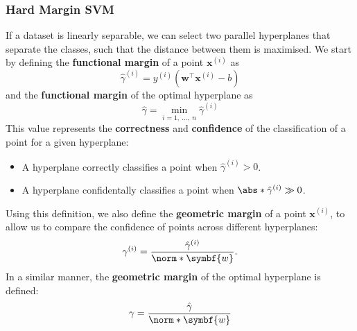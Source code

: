 \documentclass{article}
\begin{document}
\subsubsection{Hard Margin SVM}
If a dataset is linearly separable, we can select two parallel
hyperplanes that separate the classes, such that the distance between
them is maximised.
We start by defining the \textbf{functional margin} of a point
\(\symbf{x}^{\left( i \right)}\) as
\begin{equation*}
    \hat{\gamma}^{\left( i \right)} = y^{\left( i \right)} \left( \symbf{w}^\top \symbf{x}^{\left( i \right)} - b \right)
\end{equation*}
and the \textbf{functional margin} of the optimal hyperplane as
\begin{equation*}
    \hat{\gamma} = \min_{i =  1,\:\dots,\: n} \hat{\gamma}^{\left( i \right)}
\end{equation*}
This value represents the \textbf{correctness} and \textbf{confidence}
of the classification of a point for a given hyperplane:
\begin{itemize}
    \item A hyperplane correctly classifies a point when
          \(\hat{\gamma}^{\left( i \right)} > 0\).
    \item A hyperplane confidentally classifies a point when
          \(\abs*{\hat{\gamma}^{\left( i \right)}} \gg 0\).
\end{itemize}
Using this definition, we also define the \textbf{geometric margin} of a
point \(\symbf{x}^{\left( i \right)}\), to allow us to compare the
confidence of points across different hyperplanes:
\begin{equation*}
    \gamma^{\left( i \right)} = \frac{\hat{\gamma}^{\left( i \right)}}{\norm*{\symbf{w}}}.
\end{equation*}
In a similar manner, the \textbf{geometric margin} of the optimal
hyperplane is defined:
\begin{equation*}
    \gamma = \frac{\hat{\gamma}}{\norm*{\symbf{w}}}
\end{equation*}
\end{document}
